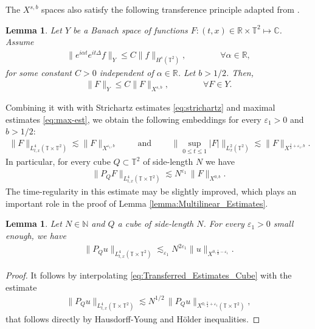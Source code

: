 \documentclass[11pt, xcolor = dvipsnames,reqno
]{amsart}
\newtheorem{lem}[thm]{Lemma}
\theoremstyle{definition}
\theoremstyle{remark}
\begin{document}
    \noindent
    The $X^{s,b}$ spaces also satisfy the following transference principle adapted from \cite[Lemma 2.9]{Tao2006-book}. 
	\begin{lem}\label{lemma:TransferLemma}
		Let $Y$ be a Banach space of functions 
		$F : (t,x) \in \mathbb{R} \times \mathbb{T}^2 \mapsto \mathbb{C}$. 
		Assume
		\begin{align*}
			\| e^{i \alpha t} e^{i t \Delta} f \|_Y \leq C \| f \|_{H^s(\mathbb{T}^2)},
            \qquad \qquad \forall \alpha \in \mathbb R,
		\end{align*}
		for some constant $C > 0$ independent of $\alpha \in \mathbb{R}$. Let $b > 1/2$. Then,
		\begin{align*}
			\|F\|_Y \leq C \|F\|_{X^{s,b}}, 
            \qquad \qquad  \forall F \in Y. 
		\end{align*}
	\end{lem}
    Combining it with  with Strichartz estimates \eqref{eq:strichartz} and maximal estimates \eqref{eq:max-est}, we obtain the following embeddings for every $\varepsilon_1 > 0$ and $b > 1/2$:
    \begin{align}\label{eq:Transferred_Estimates}
        \lVert F \rVert_{L^4_{t,x}(\mathbb T \times \mathbb T^2)} \lesssim \lVert F \rVert_{X^{\varepsilon_1, b}} 
        \qquad \text{ and } \qquad 
        \big\lVert \sup_{0 \leq t \leq 1} |F| \big\rVert_{L^2_{x}(\mathbb T^2)} \lesssim \lVert F \rVert_{X^{\frac12 + \varepsilon_1, b}}.
    \end{align}
    In particular, for every cube $Q \subset \mathbb T^2$ of side-length $N$ we have 
    \begin{align}\label{eq:Transferred_Estimates_Cube}
        \lVert P_Q F \rVert_{L^4_{t,x}(\mathbb T \times \mathbb T^2)} \lesssim N^{\varepsilon_1} \, \lVert F \rVert_{X^{0, b}}.
    \end{align}
    The time-regularity in this estimate may be slightly improved, which plays an important role in the proof of Lemma \ref{lemma:Multilinear_Estimates}.  

    \begin{lem}\label{lemma:st-int}
    Let $N \in \mathbb N$ and $Q$ a cube of side-length $N$. For every $\varepsilon_1 > 0$ small enough, we have
    \begin{align*}
        \|P_Qu\|_{L^4_{t,x}( \mathbb T \times \mathbb{T}^2)} \lesssim_{\varepsilon_1} N^{2\varepsilon_1} \|u\|_{X^{0,\frac{1}{2} - \varepsilon_1}}.
    \end{align*}
\end{lem}
\begin{proof}
    It follows by interpolating \eqref{eq:Transferred_Estimates_Cube} with the estimate
    \begin{align}
        \lVert P_Q u \rVert_{L^4_{t,x}(\mathbb  T \times \mathbb T^2)} \lesssim N^{1/2} \, \lVert P_Q u \rVert_{X^{0,\frac14 + \varepsilon_1}(\mathbb  T \times \mathbb T^2)},
    \end{align}
    that follows directly by Hausdorff-Young and H\"older inequalities. 
\end{proof}
\end{document}
